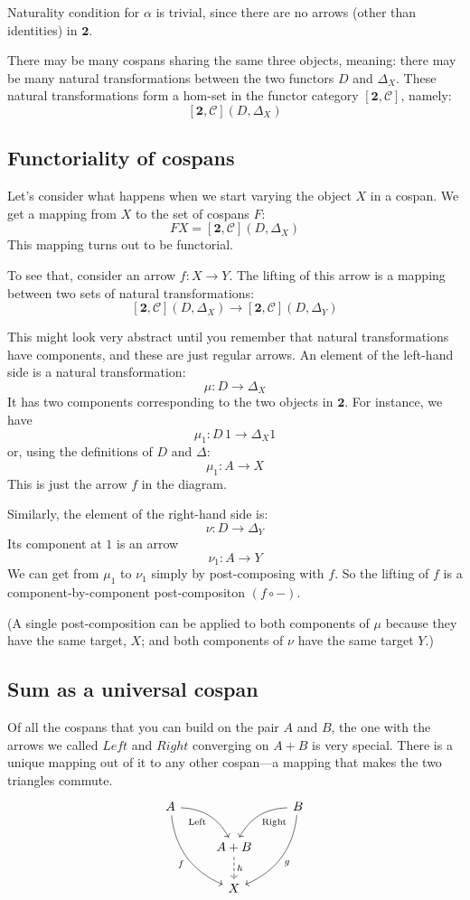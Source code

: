 \documentclass[DaoFP]{subfiles}
\begin{document}
Naturality condition for $\alpha$ is trivial, since there are no arrows (other than identities) in $\mathbf{2}$.

There may be many cospans sharing the same three objects, meaning: there may be many natural transformations between the two functors $D$ and  $\Delta_X$. These natural transformations form a hom-set in the functor category $[\mathbf{2}, \mathcal{C}]$, namely:
\[ [\mathbf{2}, \mathcal{C}](D, \Delta_X) \]

\subsection{Functoriality of cospans}

Let's consider what happens when we start varying the object $X$ in a cospan. We get a mapping from $X$ to the set of cospans $F$:
\[ F X = [\mathbf{2}, \mathcal{C}](D, \Delta_X) \]
This mapping turns out to be functorial.

To see that, consider an arrow $f \colon X \to Y$. The lifting of this arrow is a mapping between two sets of natural transformations:
\[ [\mathbf{2}, \mathcal{C}](D, \Delta_X) \to [\mathbf{2}, \mathcal{C}](D, \Delta_{Y}) \] 
 
This might look very abstract until you remember that natural transformations have components, and these are just regular arrows. An element of the left-hand side is a natural transformation:
\[ \mu \colon D \to \Delta_X \]
It has two components corresponding to the two objects in $\mathbf{2}$. For instance, we have
\[ \mu_1 \colon D \, 1 \to \Delta_X 1 \]
or, using the definitions of $D$ and $\Delta$:
\[ \mu_1 \colon A \to X \]
This is just the arrow $f$ in the diagram. 

Similarly, the element of the right-hand side is:
\[ \nu \colon D \to \Delta_{Y} \]
Its component at $1$ is an arrow
\[ \nu_1 \colon A \to Y \]
We can get from $\mu_1$ to $\nu_1$ simply by post-composing with $f$. So the lifting of $f$ is a component-by-component post-compositon $(f \circ -)$. 

(A single post-composition can be applied to both components of $\mu$ because they have the same target, $X$; and both components of $\nu$ have the same target $Y$.)

\subsection{Sum as a universal cospan}

Of all the cospans that you can build on the pair $A$ and $B$, the one with the arrows we called $Left$ and $Right$ converging on $A + B$  is very special. There is a unique mapping out of it to any other cospan---a mapping that makes the two triangles commute.  
\[
 \begin{tikzcd}
 A
 \arrow[dr,  bend left, "\text{Left}"']
 \arrow[ddr, bend right, "f"']
 && B
 \arrow[dl, bend right, "\text{Right}"]
 \arrow[ddl, bend left, "g"]
 \\
&A + B
\arrow[d, dashed, "h"]
\\
& X
 \end{tikzcd}
\]
\end{document}
